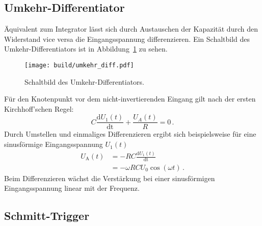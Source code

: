 \subsection*{Umkehr-Differentiator}%
\label{sub:umkehr_differentiator}
Äquivalent zum Integrator lässt sich durch Austauschen der Kapazität durch
den Widerstand vice versa die Eingangsspannung differenzieren.
Ein Schaltbild des Umkehr-Differentiators ist in Abbildung~\ref{fig:diff} zu
sehen.
\begin{figure}[ht]
		\centering
		\texttt{[image: build/umkehr\_diff.pdf]}
		\caption{Schaltbild des Umkehr-Differentiators.\cite{anleitung}}
		\label{fig:diff}
\end{figure}
Für den Knotenpunkt vor dem nicht-invertierenden Eingang gilt nach der ersten
Kirchhoff'schen Regel:
\begin{equation}
		C \frac{\text{d} U_1(t)}{\text{dt}} + \frac{U_A(t)}{R} = 0 \, .
\end{equation}
Durch Umstellen und einmaliges Differenzieren ergibt sich beispielsweise für
eine sinusförmige Eingangsspannung $U_1(t)$
\begin{align}
		U_\text{A}(t) &= - RC \frac{\text{d}U_1(t)}{\text{dt}} \nonumber \\
                  &= - \omega R C U_0 \cos(\omega t) \label{eq:differentiator} \, .
\end{align}
Beim Differenzieren wächst die Verstärkung bei einer sinusförmigen
Eingangsspannung linear mit der Frequenz.

\subsection{Schmitt-Trigger}%
\label{sub:schmitt_trigger1}

